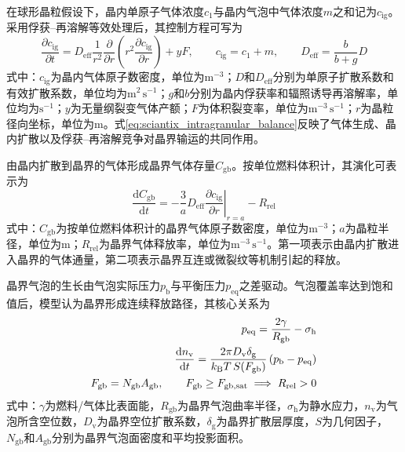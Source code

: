 在球形晶粒假设下，晶内单原子气体浓度$c_1$与晶内气泡中气体浓度$m$之和记为$c_{\mathrm{ig}}$。采用俘获--再溶解等效处理后，其控制方程可写为
\begin{equation}
	\frac{\partial c_{\mathrm{ig}}}{\partial t}
	=
	D_{\mathrm{eff}}
	\frac{1}{r^2}
	\frac{\partial}{\partial r}
	\left(
	r^2\frac{\partial c_{\mathrm{ig}}}{\partial r}
	\right)
	+yF,
	\qquad
	c_{\mathrm{ig}}=c_1+m,
	\qquad
	D_{\mathrm{eff}}=\frac{b}{b+g}D
	\label{eq:sciantix_intragranular_balance}
\end{equation}
式中：$c_{\mathrm{ig}}$为晶内气体原子数密度，单位为$\mathrm{m^{-3}}$；$D$和$D_{\mathrm{eff}}$分别为单原子扩散系数和有效扩散系数，单位均为$\mathrm{m^2\,s^{-1}}$；$g$和$b$分别为晶内俘获率和辐照诱导再溶解率，单位均为$\mathrm{s^{-1}}$；$y$为无量纲裂变气体产额；$F$为体积裂变率，单位为$\mathrm{m^{-3}\,s^{-1}}$；$r$为晶粒径向坐标，单位为$\mathrm{m}$。式\eqref{eq:sciantix_intragranular_balance}反映了气体生成、晶内扩散以及俘获--再溶解竞争对晶界输运的共同作用。

由晶内扩散到晶界的气体形成晶界气体存量$C_{\mathrm{gb}}$。按单位燃料体积计，其演化可表示为
\begin{equation}
	\frac{\mathrm{d}C_{\mathrm{gb}}}{\mathrm{d}t}
	=
	-\frac{3}{a}
	D_{\mathrm{eff}}
	\left.
	\frac{\partial c_{\mathrm{ig}}}{\partial r}
	\right|_{r=a}
	-R_{\mathrm{rel}}
	\label{eq:sciantix_intergranular_balance}
\end{equation}
式中：$C_{\mathrm{gb}}$为按单位燃料体积计的晶界气体原子数密度，单位为$\mathrm{m^{-3}}$；$a$为晶粒半径，单位为$\mathrm{m}$；$R_{\mathrm{rel}}$为晶界气体释放率，单位为$\mathrm{m^{-3}\,s^{-1}}$。第一项表示由晶内扩散进入晶界的气体通量，第二项表示晶界互连或微裂纹等机制引起的释放。

晶界气泡的生长由气泡实际压力$p_{\mathrm{b}}$与平衡压力$p_{\mathrm{eq}}$之差驱动。气泡覆盖率达到饱和值后，模型认为晶界形成连续释放路径，其核心关系为
\begin{align}
	p_{\mathrm{eq}}
	=\frac{2\gamma}{R_{\mathrm{gb}}}-\sigma_{\mathrm{h}}
	\notag
	\\
	\frac{\mathrm{d}n_{\mathrm{v}}}{\mathrm{d}t}
	=\frac{2\pi D_{\mathrm{v}}\delta_{\mathrm{g}}}
	{k_{\mathrm{B}}T\,S(F_{\mathrm{gb}})}
	\left(p_{\mathrm{b}}-p_{\mathrm{eq}}\right)
	\notag
	\\
	F_{\mathrm{gb}}
	=N_{\mathrm{gb}}A_{\mathrm{gb}},
	\qquad
	F_{\mathrm{gb}}\geq F_{\mathrm{gb,sat}}
	\;\Longrightarrow\;
	R_{\mathrm{rel}}>0
	\label{eq:sciantix_bubble_growth_interconnection}
\end{align}
式中：$\gamma$为燃料/气体比表面能，$R_{\mathrm{gb}}$为晶界气泡曲率半径，$\sigma_{\mathrm{h}}$为静水应力，$n_{\mathrm{v}}$为气泡所含空位数，$D_{\mathrm{v}}$为晶界空位扩散系数，$\delta_{\mathrm{g}}$为晶界扩散层厚度，$S$为几何因子，$N_{\mathrm{gb}}$和$A_{\mathrm{gb}}$分别为晶界气泡面密度和平均投影面积。

